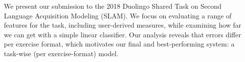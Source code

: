 We present our submission to the 2018 Duolingo Shared Task on Second Language Acquisition Modeling (SLAM). We focus on evaluating a range of features for the task, including user-derived measures, while examining how far we can get with a simple linear classifier. Our analysis reveals that errors differ per exercise format, which motivates our final and best-performing system: a task-wise (per exercise-format) model.
